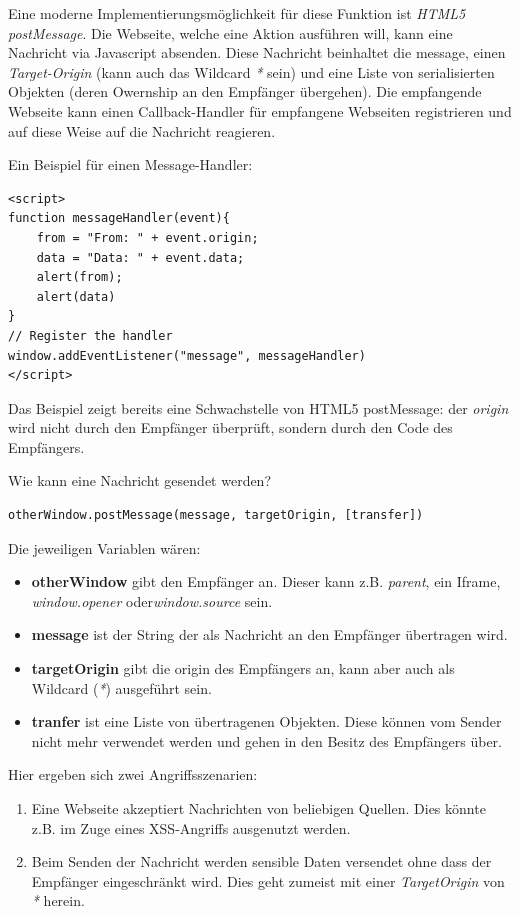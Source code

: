 Eine moderne Implementierungsmöglichkeit für diese Funktion ist \textit{HTML5 postMessage}. Die Webseite, welche eine Aktion ausführen will, kann eine Nachricht via Javascript absenden. Diese Nachricht beinhaltet die message, einen \textit{Target-Origin} (kann auch das Wildcard \textit{*} sein) und eine Liste von serialisierten Objekten (deren Owernship an den Empfänger übergehen). Die empfangende Webseite kann einen Callback-Handler für empfangene Webseiten registrieren und auf diese Weise auf die Nachricht reagieren.

Ein Beispiel für einen Message-Handler:

\begin{verbatim}
<script>
function messageHandler(event){
	from = "From: " + event.origin;
	data = "Data: " + event.data;
	alert(from);
	alert(data)
}
// Register the handler
window.addEventListener("message", messageHandler)
</script>
\end{verbatim}

Das Beispiel zeigt bereits eine Schwachstelle von HTML5 postMessage: der \textit{origin} wird nicht durch den Empfänger überprüft, sondern durch den Code des Empfängers.

Wie kann eine Nachricht gesendet werden?

\begin{verbatim}
otherWindow.postMessage(message, targetOrigin, [transfer])
\end{verbatim}

Die jeweiligen Variablen wären:

\begin{itemize}
\item \textbf{otherWindow} gibt den Empfänger an. Dieser kann z.B. \textit{parent}, ein Iframe, \textit{window.opener} oder\textit{window.source} sein.
\item \textbf{message} ist der String der als Nachricht an den Empfänger übertragen wird.
\item \textbf{targetOrigin} gibt die origin des Empfängers an, kann aber auch als Wildcard (\textit{*}) ausgeführt sein.
\item \textbf{tranfer} ist eine Liste von übertragenen Objekten. Diese können vom Sender nicht mehr verwendet werden und gehen in den Besitz des Empfängers über.
\end{itemize}

Hier ergeben sich zwei Angriffsszenarien:

\begin{enumerate}
	\item Eine Webseite akzeptiert Nachrichten von beliebigen Quellen. Dies könnte z.B. im Zuge eines XSS-Angriffs ausgenutzt werden.
	\item Beim Senden der Nachricht werden sensible Daten versendet ohne dass der Empfänger eingeschränkt wird. Dies geht zumeist mit einer \textit{TargetOrigin} von \textit{*} herein.
\end{enumerate}

